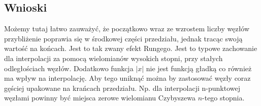 \documentclass{article}
\begin{document}
\subsection{Wnioski}
Możemy tutaj łatwo zauważyć, że początkowo wraz ze wzrostem liczby węzłów przybliżenie poprawia się w środkowej części przedziału, jednak tracąc swoją wartość na końcach. Jest to tak zwany efekt Rungego. Jest to typowe zachowanie dla interpolacji za pomocą wielomianów wysokich stopni, przy stałych odległościach węzłów. Dodatkowo funkcja $|x|$ nie jest funkcją gładką co również ma wpływ na interpolację. Aby tego uniknąć można by zastosować węzły coraz gęściej upakowane na krańcach przedziału. Np. dla interpolacji n-punktowej węzłami powinny być miejsca zerowe wielomianu Czybyszewa $n$-tego stopnia.
\end{document}
